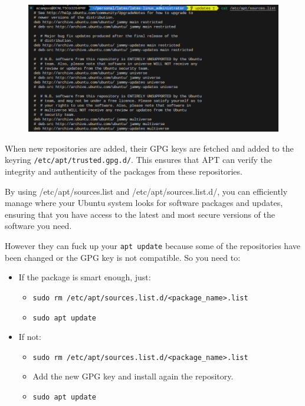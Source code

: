 \documentclass{article}
\newenvironment{blocktemplateIII}[1]{%
    \tcolorbox[beamer,%
    noparskip,breakable,
    ,colframe=Red,%
    colbacklower=LimeGreen!75!LightGreen,%
    title=#1]}%
    {\endtcolorbox}
\begin{document}
\begin{figure}[H]
    \includegraphics[width=\textwidth]{pictures/apt2.png}
    \centering
\end{figure}

When new repositories are added,  their GPG keys are fetched and added to the keyring \verb|/etc/apt/trusted.gpg.d/|. This ensures that APT can verify the integrity and authenticity of the packages from these repositories. 

By using /etc/apt/sources.list and /etc/apt/sources.list.d/, you can efficiently manage where your Ubuntu system looks for software packages and updates, ensuring that you have access to the latest and most secure versions of the software you need.

\begin{blocktemplateIII}{Warning}
However they can fuck up your \verb|apt update| because some of the repositories have been changed or the GPG key is not compatible. So you need to:
\begin{itemize}
    \item If the package is smart enough, just:
    \begin{itemize}
        \item \verb|sudo rm /etc/apt/sources.list.d/<package_name>.list|
        \item \verb|sudo apt update|
    \end{itemize}

    \item If not:
    \begin{itemize}
        \item \verb|sudo rm /etc/apt/sources.list.d/<package_name>.list|
        \item Add the new GPG key and install again the repository.
        \item \verb|sudo apt update|
    \end{itemize}
\end{itemize} 
\end{blocktemplateIII}
\end{document}
